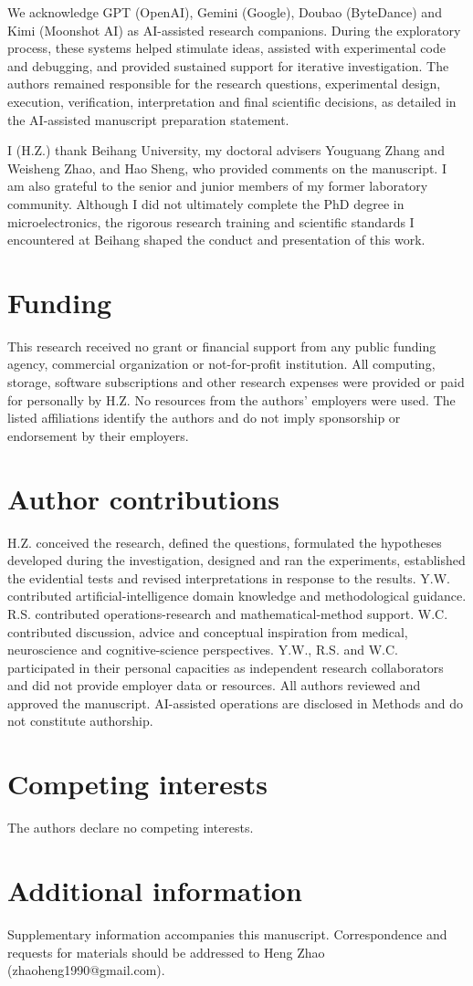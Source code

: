 \documentclass[11pt]{article}
\begin{document}
{We acknowledge GPT (OpenAI), Gemini (Google), Doubao (ByteDance) and Kimi (Moonshot AI) as AI-assisted research companions. During the exploratory process, these systems helped stimulate ideas, assisted with experimental code and debugging, and provided sustained support for iterative investigation. The authors remained responsible for the research questions, experimental design, execution, verification, interpretation and final scientific decisions, as detailed in the AI-assisted manuscript preparation statement.

I (H.Z.) thank Beihang University, my doctoral advisers Youguang Zhang and Weisheng Zhao, and Hao Sheng, who provided comments on the manuscript. I am also grateful to the senior and junior members of my former laboratory community. Although I did not ultimately complete the PhD degree in microelectronics, the rigorous research training and scientific standards I encountered at Beihang shaped the conduct and presentation of this work.

\section{Funding}
This research received no grant or financial support from any public funding agency, commercial organization or not-for-profit institution. All computing, storage, software subscriptions and other research expenses were provided or paid for personally by H.Z. No resources from the authors' employers were used. The listed affiliations identify the authors and do not imply sponsorship or endorsement by their employers.

\section{Author contributions}
H.Z. conceived the research, defined the questions, formulated the hypotheses developed during the investigation, designed and ran the experiments, established the evidential tests and revised interpretations in response to the results. Y.W. contributed artificial-intelligence domain knowledge and methodological guidance. R.S. contributed operations-research and mathematical-method support. W.C. contributed discussion, advice and conceptual inspiration from medical, neuroscience and cognitive-science perspectives. Y.W., R.S. and W.C. participated in their personal capacities as independent research collaborators and did not provide employer data or resources. All authors reviewed and approved the manuscript. AI-assisted operations are disclosed in Methods and do not constitute authorship.

\section{Competing interests}
The authors declare no competing interests.

\section{Additional information}
Supplementary information accompanies this manuscript. Correspondence and requests for materials should be addressed to Heng Zhao (zhaoheng1990@gmail.com).

}
\end{document}
